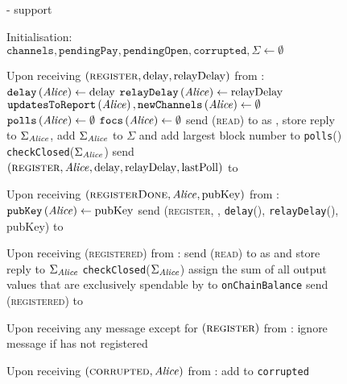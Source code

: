   \begin{figure}[H]
    \begin{systembox}{\fpaynet - support}
      \begin{algorithmic}[1]
        \State Initialisation:
        \Indent
          \State $\mathtt{channels}, \mathtt{pendingPay}, \mathtt{pendingOpen},
          \mathtt{corrupted}, \Sigma \gets \emptyset$
        \EndIndent
        \Statex

        \State Upon receiving $\left(\textsc{register}, \mathrm{delay},
        \mathrm{relayDelay}\right)$ from \alice:
        \Indent
          \State $\mathtt{delay}\left(\mathit{Alice}\right) \gets \mathrm{delay}$
          \State $\mathtt{relayDelay}\left(\mathit{Alice}\right) \gets
          \mathrm{relayDelay}$
          \State $\mathtt{updatesToReport}\left(\mathit{Alice}\right),
          \mathtt{newChannels}\left(\mathit{Alice}\right) \gets \emptyset$
          \State $\mathtt{polls}\left(\mathit{Alice}\right) \gets \emptyset$
          \State $\mathtt{focs}\left(\mathit{Alice}\right) \gets \emptyset$
          \State send (\textsc{read}) to \ledger{} as \alice{}, store reply to
          $\Sigma_{\mathit{Alice}}$, add $\Sigma_{\mathit{Alice}}$ to $\Sigma$ and add largest
          block number to \texttt{polls}(\alice)
          \label{alg:fpaynet:support:lastpoll}
          \State \texttt{checkClosed}($\Sigma_{\mathit{Alice}}$)
          \State send $\left(\textsc{register}, \mathit{Alice}, \mathrm{delay},
          \mathrm{relayDelay}, \mathrm{lastPoll}\right)$ to \simulator
        \EndIndent
        \Statex

        \State Upon receiving $\left(\textsc{registerDone}, \mathit{Alice},
        \mathrm{pubKey}\right)$ from \simulator:
        \Indent
          \State $\mathtt{pubKey}\left(\mathit{Alice}\right) \gets \mathrm{pubKey}$
          \State send (\textsc{register}, \alice, \texttt{delay}(\alice),
          \texttt{relayDelay}(\alice), pubKey) to \alice
        \EndIndent
        \Statex

        \State Upon receiving (\textsc{registered}) from \alice:
        \Indent
          \State send (\textsc{read}) to \ledger{} as \alice{} and store reply
          to $\Sigma_{\mathit{Alice}}$
          \State \texttt{checkClosed}($\Sigma_{\mathit{Alice}}$)
          \State assign the sum of all output values that are exclusively
          spendable by \alice{} to \texttt{onChainBalance}
          \State send (\textsc{registered}) to \alice
        \EndIndent
        \Statex

        \State Upon receiving any message except for
        $\left(\textsc{register}\right)$ from \alice:
        \Indent
          \State ignore message if \alice{} has not registered
          \label{alg:fpaynet:support:unreg}
        \EndIndent
        \Statex

        \State Upon receiving $\left(\textsc{corrupted}, \mathit{Alice}\right)$ from
        \simulator:
        \Indent
          \State add \alice{} to \texttt{corrupted}
        \EndIndent
      \end{algorithmic}
    \end{systembox}
    \caption{}
    \label{alg:fpaynet:support}
  \end{figure}

